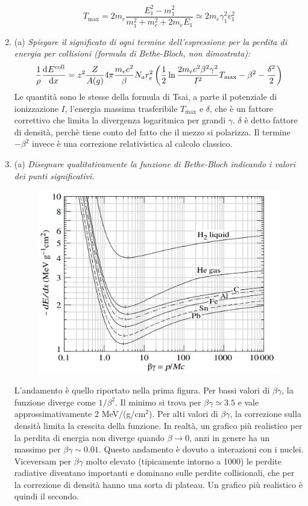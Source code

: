 \documentclass{article}
\renewcommand{\a}{(a)}
\renewcommand{\t}[1]{\textit{ #1}}
\begin{document}
\begin{enumerate}
	\[T_\textrm{max}=2m_e\frac{E_1^2-m_1^2}{m_1^2+m_e^2+2m_eE_1}\simeq2m_e\gamma_1^2v_1^2\]
	\item\a\t{Spiegare il significato di ogni termine dell’espressione per la perdita di energia
		per collisioni (formula di Bethe-Bloch, non dimostrata):\[\frac{1}{\rho}\dfrac{\mathrm{d} ^{}E^\mathrm{coll}}{\mathrm{d} {x}^{}} = z^2\frac{Z}{A(g)}4\pi\frac{m_ec^2}{\beta}N_ar_e^2\left(\frac{1}{2}\ln\frac{2m_ec^2\beta^2\gamma^2}{I^2}T_\mathrm{max}-\beta^2-\frac{\delta^2}{2}\right)\]}
	Le quantità sono le stesse della formula di Tsai, a parte il potenziale di ionizzazione $I$, l'energia massima trasferibile $T_\textrm{max}$ e $\delta$, che è un fattore correttivo che limita la divergenza logaritmica per grandi $\gamma$. $\delta$ è detto fattore di densità, perchè tiene conto del fatto che il mezzo si polarizza. Il termine $-\beta^2$ invece è una correzione relativistica al calcolo classico.
	\item\a\t{Disegnare qualitativamente la funzione di Bethe-Bloch indicando i valori dei
		punti significativi.}
	\begin{figure}[h!]
		\centering
		\includegraphics[scale=0.5]{bethe.png}
	\end{figure}
L'andamento è quello riportato nella prima figura. Per bassi valori di $\beta\gamma$, la funzione diverge come $1/\beta^2$. Il minimo si trova per $\beta\gamma\simeq 3.5$ e vale approssimativamente 2 MeV/(g/cm$^2$). Per alti valori di $\beta\gamma$, la correzione sulla densità limita la crescita della funzione. In realtà, un grafico più realistico per la perdita di energia non diverge quando $\beta\to0$, anzi in genere ha un massimo per $\beta\gamma\sim0.01$. Questo andamento è dovuto a interazioni con i nuclei. Viceversam per $\beta\gamma$ molto elevato (tipicamente intorno a 1000) le perdite radiative diventano importanti e dominano sulle perdite collisionali, che per la correzione di densità hanno una sorta di plateau. Un grafico più realistico è quindi il secondo.

\end{enumerate}
\end{document}
